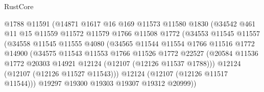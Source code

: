 \begin{lexlean}{RustCore}
\begin{coremodule}
                              @1788
                              @11591
                              (@14871
                                @1617
                                @16
                                @169
                                @11573
                                @11580
                                @1830
                                (@34542
                                  @461
                                  @11
                                  @15
                                  @11559
                                  @11572
                                  @11579
                                  @1766
                                  @11508
                                  @1772
                                  (@34553
                                    @11545
                                    @11557
                                    (@34558
                                      @11545
                                      @11555
                                      @4080
                                      (@34565
                                        @11544
                                        @11554
                                        @1766
                                        @11516
                                        @1772
                                        @14900
                                        (@34575
                                          @11543
                                          @11553
                                          @1766
                                          @11526
                                          @1772
                                          @22527
                                          (@20584
                                            @11536
                                            @1772
                                            @20303
                                            @14921
                                            @12124
                                            (@12107 (@12126 @11537 @1788)))
                                          @12124
                                          (@12107 (@12126 @11527 @11543)))
                                        @12124
                                        (@12107 (@12126 @11517 @11544)))
                                      @19297
                                      @19300
                                      @19303
                                      @19307
                                      @19312
                                      @20999))

\end{coremodule}
\end{lexlean}
